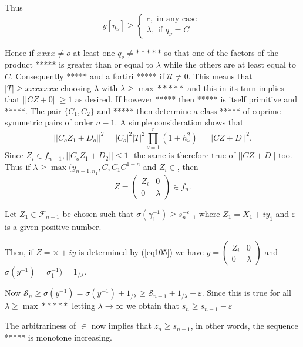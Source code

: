 Thus 
\begin{equation*}
y[\eta_{\nu}] \geq
\begin{cases}
c, \text{ in any case }\\
\lambda, \text{ if } q_\nu = C 
\end{cases}
\end{equation*}

Hence if $xxxx \neq o$ at least one $q_{\nu} \neq *****$ so that one
of the factors of the product ***** is greater than or equal to
$\lambda$ while the others are at least equal to $C$. Consequently
***** and a fortiri ***** if $\mathscr{U} \neq 0$. This means that $|
T | \geq xxxxxxx$ choosing $\lambda$ with $\lambda \geq \max *****$
and this in its turn implies that $|| CZ + 0 ||\geq 1$ as desired. If
however ***** then ***** is itself primitive and *****. The pair $\{
C_1, C_2 \}$ and ***** then determine a class ***** of coprime
symmetric pairs of order $n-1$. A simple consideration shows that
$$
||C_o Z_1 + D_o ||^2 = | C_o |^2 | T |^2 \prod\limits_{\nu = 1}^{r}
(1 + h^2_\nu) = ||CZ+D||^2.
$$\pageoriginale
 Since $Z_i \in  f_{n-1}, || C_o Z_1 + D_2|| \leq
1$- the same is therefore true of $|| CZ + D ||$ too. Thus if  $
\lambda \geq \max (y_{n-1, n_1}, C, C_1C^{1-n}$ and $Z_i \in $, then  
\begin{equation*}
Z=
\begin{pmatrix}
Z_i & 0 \\
0 & \lambda
\end{pmatrix}
\in f_n. \tag{105}\label{eq105}
\end{equation*}

Let $Z_1 \in \mathcal{F}_{n-1}$ be chosen such that $\sigma
(\gamma^{-1}_1) \geq s_{n-1}^{- \varepsilon}$ where $Z_1 = X_1 + i y_1
$ and $\varepsilon$ is a given positive number. 

Then, if $Z = \times + i y$ is determined by (\ref{eq105}) we have $y
= \begin{pmatrix} 
Z_i & 0 \\
0 & \lambda
\end{pmatrix} $ and $\sigma (y^{-1}) = \sigma^{-1}_1) = 1_{/
  \lambda}$. 

Now $\mathcal{S}_n \geq \sigma(y^{-1}) = \sigma(y^{-1}) +1_{/ \lambda}
\geq \mathcal{S}_{n-1}+ 1_{/ \lambda} - \varepsilon$. Since this is
true for all $\lambda \geq \max *****  $ letting $\lambda \to \infty$
we obtain that $s_n \geq s_{n-1} - \varepsilon$  

The arbitrariness of $\in$ now implies that $z_n \geq s_{n-1}$, in
other words, the sequence ***** is monotone increasing. 

